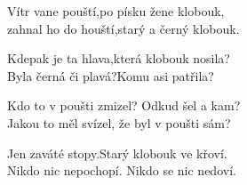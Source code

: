 
\nv{}Vítr vane pouští,\mm\nc {}po písku žene klobouk, \\
zahnal ho do houští,\nc {}starý a černý klobouk. \\
\vnv

\nv{}Kdepak je ta hlava,\mm\nc{}která klobouk nosila?\\
Byla černá či plavá?\nc{}Komu asi patřila?\\
\vnv

\nv{}Kdo to v poušti zmizel? Odkud šel a kam?\\
Jakou to měl svízel, že byl v poušti sám? \\
\vnv

\nv{}Jen zaváté stopy.\mm\nc{}Starý klobouk ve křoví.\\
Nikdo nic nepochopí. Nikdo se nic nedoví.
\newpage
